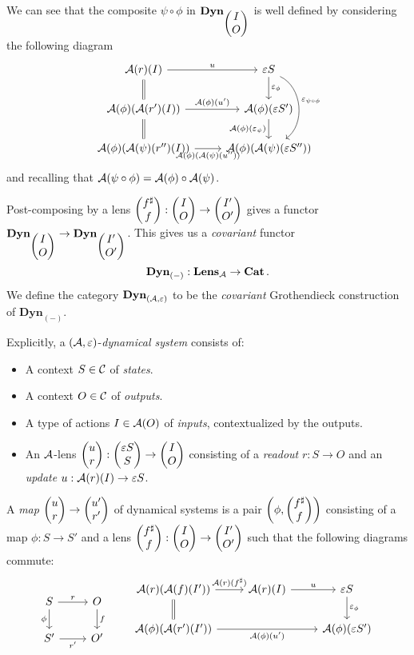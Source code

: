 We can see that the composite $\psi \circ \phi$ in $\textbf{Dyn}_{\begin{pmatrix}{I} \\ {O} \end{pmatrix}}$ is well defined by
considering the following diagram
\[
  \begin{tikzcd}
      \Aa(r)(I) \arrow[r, "u"] \arrow[d, equal] & \varepsilon S \arrow[d,
      "\varepsilon_{\phi}"] \arrow[dd, bend left = 60, "\varepsilon_{\psi \circ \phi}"] \\
      \Aa(\phi)(\Aa(r')(I)) \arrow[r, "\Aa(\phi)(u')"] \arrow[d, equal] & \Aa(\phi)(\varepsilon
      S') \arrow[d, "\Aa(\phi)(\varepsilon_{\psi})"']\\
      \Aa(\phi)(\Aa(\psi)(r'')(I)) \arrow[r,"\Aa(\phi)(\Aa(\psi)(u''))"' ] &
      \Aa(\phi)(\Aa(\psi)(\varepsilon S''))
  \end{tikzcd}
\]
and recalling that $\operatorname{\mathcal{A}}(\psi \circ \phi) = \operatorname{\mathcal{A}}(\phi)\circ \operatorname{\mathcal{A}}(\psi)$.

Post-composing by a lens $\begin{pmatrix}{f^{\sharp}} \\ {f} \end{pmatrix} : \begin{pmatrix}{I} \\ {O} \end{pmatrix} \to \begin{pmatrix}{I'} \\ {O'} \end{pmatrix}$
gives a functor $\textbf{Dyn}_{\begin{pmatrix}{I} \\ {O} \end{pmatrix}} \to \textbf{Dyn}_{\begin{pmatrix}{I'} \\ {O'} \end{pmatrix}}$.
This gives us a \emph{covariant} functor
$$\textbf{Dyn}_{(-)} : \textbf{Lens}_{\operatorname{\mathcal{A}}} \to \operatorname{\textbf{Cat}}.$$
We define the category $\textbf{Dyn}_{(\operatorname{\mathcal{A}}, \varepsilon)}$ to be the
\emph{covariant} Grothendieck construction of $\textbf{Dyn}_{(-)}$.

Explicitly, a $(\operatorname{\mathcal{A}},\varepsilon)$-\emph{dynamical system} consists of:
\begin{itemize}
\item A context $S \in \operatorname{\mathcal{C}}$ of \emph{states}.
\item A context $O \in \operatorname{\mathcal{C}}$ of \emph{outputs}.
\item A type of actions $I \in \operatorname{\mathcal{A}}(O)$ of \emph{inputs}, contextualized by the
  outputs.
\item An $\operatorname{\mathcal{A}}$-lens $\begin{pmatrix}{u} \\ {r} \end{pmatrix} : \begin{pmatrix}{\varepsilon S} \\ {S} \end{pmatrix} \to \begin{pmatrix}{I} \\ {O} \end{pmatrix}$
  consisting of a \emph{readout} $r : S \to O$ and an \emph{update} $u :
  \operatorname{\mathcal{A}}(r)(I) \to \varepsilon S$.
\end{itemize}

A \emph{map} $\begin{pmatrix}{u} \\ {r} \end{pmatrix} \to \begin{pmatrix}{u'} \\ {r'} \end{pmatrix}$ of dynamical systems is a pair $\left(\phi, \begin{pmatrix}{f^{\sharp}} \\ {f} \end{pmatrix}\right)$
consisting of a map $\phi : S \to S'$ and a lens $\begin{pmatrix}{f^{\sharp}} \\ {f} \end{pmatrix} :
\begin{pmatrix}{I} \\ {O} \end{pmatrix} \to \begin{pmatrix}{I'} \\ {O'} \end{pmatrix}$ such that the following diagrams commute:
\[
\begin{tikzcd}
S \arrow[r,"r" ] \arrow[d,"\phi"' ]& O \arrow[d,"f" ]\\
S' \arrow[r,"r'"' ] & O'
\end{tikzcd}
\quad\quad
\begin{tikzcd}
  \Aa(r)(\Aa(f)(I')) \arrow[r,"\Aa(r)(f^{\sharp})"] \arrow[d, equal] &\Aa(r)(I) \arrow[r, "u"] &\varepsilon S \arrow[d, "\varepsilon_{\phi}"]
  \\
  \Aa(\phi)(\Aa(r')(I')) \arrow[rr,"\Aa(\phi)(u')"'] & &\Aa(\phi)(\varepsilon S') \\
\end{tikzcd}
\]

